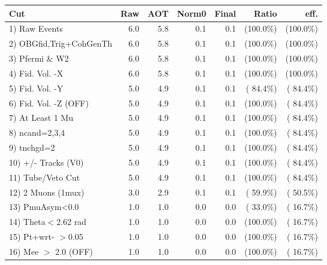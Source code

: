  \begin{table}[h!]\centering
 \begin{tabular}{||l||r|r|r|r|r|r||}
 \hline
 \hline
 Cut & Raw & AOT & Norm0 & Final & Ratio & eff.       \\
 \hline
  1) Raw Events           &          6.0 &          5.8 &          0.1 &          0.1 & (100.0\%) & (100.0\%) \\
  2) OBGfid,Trig+CohGenTh &          6.0 &          5.8 &          0.1 &          0.1 & (100.0\%) & (100.0\%) \\
  3) Pfermi \& W2         &          6.0 &          5.8 &          0.1 &          0.1 & (100.0\%) & (100.0\%) \\
  4) Fid. Vol. -X         &          6.0 &          5.8 &          0.1 &          0.1 & (100.0\%) & (100.0\%) \\
  5) Fid. Vol. -Y         &          5.0 &          4.9 &          0.1 &          0.1 & ( 84.4\%) & ( 84.4\%) \\
  6) Fid. Vol. -Z (OFF)   &          5.0 &          4.9 &          0.1 &          0.1 & (100.0\%) & ( 84.4\%) \\
  7) At Least 1 Mu        &          5.0 &          4.9 &          0.1 &          0.1 & (100.0\%) & ( 84.4\%) \\
  8) ncand=2,3,4          &          5.0 &          4.9 &          0.1 &          0.1 & (100.0\%) & ( 84.4\%) \\
  9) tnchgd=2             &          5.0 &          4.9 &          0.1 &          0.1 & (100.0\%) & ( 84.4\%) \\
 10) +/- Tracks (V0)      &          5.0 &          4.9 &          0.1 &          0.1 & (100.0\%) & ( 84.4\%) \\
 11) Tube/Veto Cut        &          5.0 &          4.9 &          0.1 &          0.1 & (100.0\%) & ( 84.4\%) \\
 12) 2 Muons (1mux)       &          3.0 &          2.9 &          0.1 &          0.1 & ( 59.9\%) & ( 50.5\%) \\
 13) PmuAsym<0.0          &          1.0 &          1.0 &          0.0 &          0.0 & ( 33.0\%) & ( 16.7\%) \\
 14) Theta$<$2.62 rad     &          1.0 &          1.0 &          0.0 &          0.0 & (100.0\%) & ( 16.7\%) \\
 15) Pt+wrt- $>$0.05      &          1.0 &          1.0 &          0.0 &          0.0 & (100.0\%) & ( 16.7\%) \\
 16) Mee $>$ 2.0  (OFF)   &          1.0 &          1.0 &          0.0 &          0.0 & (100.0\%) & ( 16.7\%) \\

\end{tabular}
\end{table}
